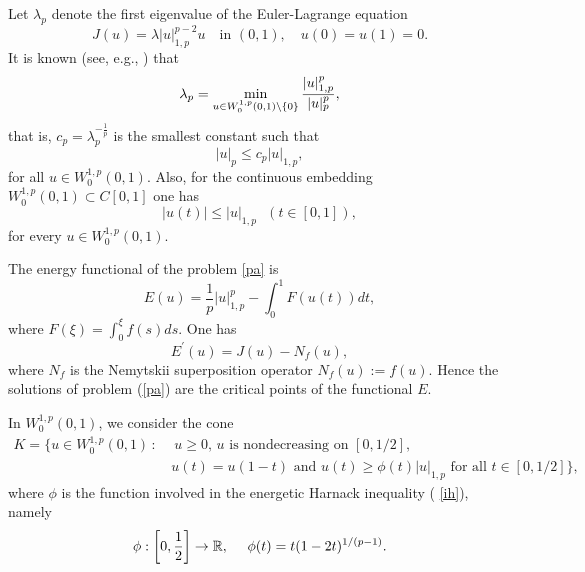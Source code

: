\documentclass{birkjour}
\theoremstyle{definition}
\theoremstyle{remark}
\numberwithin{equation}{section}
\begin{document}
Let $\lambda _{p}$ denote the first eigenvalue of the Euler-Lagrange
equation
\begin{equation*}
J\left( u\right) =\lambda |u|_{1,p}^{p-2}u\quad \text{in }(0,1),\quad
u(0)=u(1)=0.
\end{equation*}%
It is known (see, e.g., \cite{djm}) that
\begin{equation*}
\lambda _{p}=\min_{u\in W_{0}^{1,p}\left( 0,1\right) \setminus \{0\}}\frac{%
|u|_{1,p}^{p}}{|u|_{p}^{p}},
\end{equation*}%
that is, $c_{p}=\lambda _{p}^{-\frac{1}{p}}$ is the smallest constant such
that
\begin{equation}
\left\vert u\right\vert _{p}\leq c_{p}|u|_{1,p},  \label{f8}
\end{equation}%
for all $u\in W_{0}^{1,p}(0,1)$. Also, for the continuous embedding $%
W_{0}^{1,p}(0,1)\subset C[0,1]$ one has
\begin{equation*}
\left\vert u(t)\right\vert \leq |u|_{1,p}\ \ \ \left( t\in \left[ 0,1\right]
\right) ,
\end{equation*}%
for every $u\in W_{0}^{1,p}(0,1)$.


The energy functional of the problem \eqref{pa} is
\begin{equation*}
E(u)=\frac{1}{p}\left\vert u\right\vert _{1,p}^{p}-\int_{0}^{1}F(u(t))dt,
\end{equation*}%
where $F(\xi )=\int_{0}^{\xi }f(s)ds$. One has
\begin{equation*}
E^{\prime }(u)=J\left( u\right) -N_{f}\left( u\right) ,
\end{equation*}%
where $N_{f}$ is the Nemytskii superposition operator $N_{f}\left( u\right)
:=f(u).$ Hence the solutions of problem (\ref{pa}) are the critical points
of the functional $E.$

In $W_{0}^{1,p}(0,1)$, we consider the cone
\begin{equation*}
\begin{aligned} K = \Big\{ u \in W_0^{1,p}(0,1) \, : \, &\  u \geq 0, \,u
\text{ is nondecreasing on } [0,1/2], \\ & u(t) = u(1-t)\text{ and } u(t)
\geq \phi(t) |u|_{1,p} \text{ for all } t \in [0,1/2] \Big\}, \end{aligned}
\end{equation*}%
where $\phi $ is the function involved in the energetic Harnack inequality (%
\ref{ih}), namely%
\begin{equation*}
\phi :\left[ 0,\frac{1}{2}\right] \rightarrow \mathbb{R},\text{ \quad $\phi
(t)=t(1-2t)^{1/(p-1)}$.}
\end{equation*}
\end{document}
